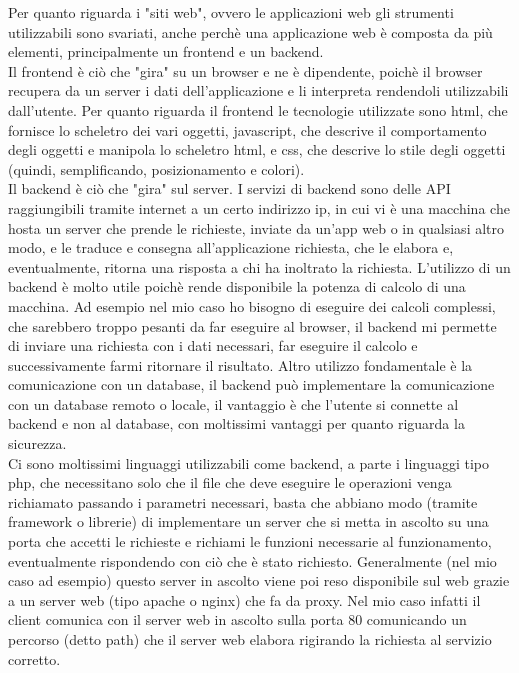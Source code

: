 \noindent
Per quanto riguarda i "siti web", ovvero le applicazioni web gli strumenti utilizzabili sono svariati, anche perchè una applicazione web è composta da più elementi, principalmente un frontend e un backend.\\
Il frontend è ciò che "gira" su un browser e ne è dipendente, poichè il browser recupera da un server i dati dell'applicazione e li interpreta rendendoli utilizzabili dall'utente. Per quanto riguarda il frontend le tecnologie utilizzate sono html, che fornisce lo scheletro dei vari oggetti, javascript, che descrive il comportamento degli oggetti e manipola lo scheletro html, e css, che descrive lo stile degli oggetti (quindi, semplificando, posizionamento e colori).\\
Il backend è ciò che "gira" sul server. I servizi di backend sono delle API raggiungibili tramite internet a un certo indirizzo ip, in cui vi è una macchina che hosta un server che prende le richieste, inviate da un'app web o in qualsiasi altro modo, e le traduce e consegna all'applicazione richiesta, che le elabora e, eventualmente, ritorna una risposta a chi ha inoltrato la richiesta. L'utilizzo di un backend è molto utile poichè rende disponibile la potenza di calcolo di una macchina. Ad esempio nel mio caso ho bisogno di eseguire dei calcoli complessi, che sarebbero troppo pesanti da far eseguire al browser, il backend mi permette di inviare una richiesta con i dati necessari, far eseguire il calcolo e successivamente farmi ritornare il risultato. Altro utilizzo fondamentale è la comunicazione con un database, il backend può implementare la comunicazione con un database remoto o locale, il vantaggio è che l'utente si connette al backend e non al database, con moltissimi vantaggi per quanto riguarda la sicurezza.\\
Ci sono moltissimi linguaggi utilizzabili come backend, a parte i linguaggi tipo php, che necessitano solo che il file che deve eseguire le operazioni venga richiamato passando i parametri necessari, basta che abbiano modo (tramite framework o librerie) di implementare un server che si metta in ascolto su una porta che accetti le richieste e richiami le funzioni necessarie al funzionamento, eventualmente rispondendo con ciò che è stato richiesto. Generalmente (nel mio caso ad esempio) questo server in ascolto viene poi reso disponibile sul web grazie a un server web (tipo apache o nginx) che fa da proxy. Nel mio caso infatti il client comunica con il server web in ascolto sulla porta 80 comunicando un percorso (detto path) che il server web elabora rigirando la richiesta al servizio corretto.\\

